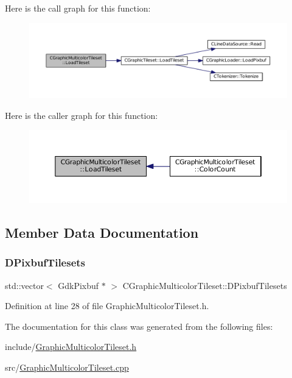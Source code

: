 Here is the call graph for this function\+:\nopagebreak
\begin{figure}[H]
\begin{center}
\leavevmode
\includegraphics[width=350pt]{classCGraphicMulticolorTileset_a6ab975d5bc2ba0ed892de03bba9242cc_cgraph}
\end{center}
\end{figure}
Here is the caller graph for this function\+:\nopagebreak
\begin{figure}[H]
\begin{center}
\leavevmode
\includegraphics[width=350pt]{classCGraphicMulticolorTileset_a6ab975d5bc2ba0ed892de03bba9242cc_icgraph}
\end{center}
\end{figure}


\subsection{Member Data Documentation}
\hypertarget{classCGraphicMulticolorTileset_a30809d113b0f314944425a3c8f21408c}{}\label{classCGraphicMulticolorTileset_a30809d113b0f314944425a3c8f21408c} 
\subsubsection{\texorpdfstring{D\+Pixbuf\+Tilesets}{DPixbufTilesets}}
{\footnotesize\ttfamily std\+::vector$<$ Gdk\+Pixbuf $\ast$ $>$ C\+Graphic\+Multicolor\+Tileset\+::\+D\+Pixbuf\+Tilesets\hspace{0.3cm}{\ttfamily [protected]}}



Definition at line 28 of file Graphic\+Multicolor\+Tileset.\+h.



The documentation for this class was generated from the following files\+:\begin{DoxyCompactItemize}
\item 
include/\hyperlink{GraphicMulticolorTileset_8h}{Graphic\+Multicolor\+Tileset.\+h}\item 
src/\hyperlink{GraphicMulticolorTileset_8cpp}{Graphic\+Multicolor\+Tileset.\+cpp}\end{DoxyCompactItemize}
